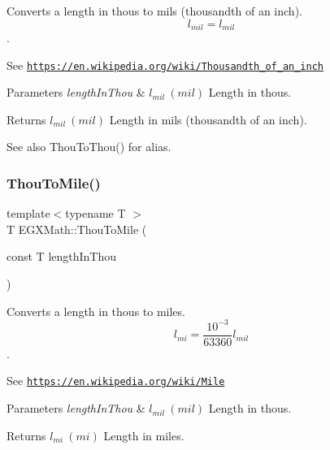 Converts a length in thous to mils (thousandth of an inch). \[ l_{mil}=l_{mil} \]. 

See \href{https://en.wikipedia.org/wiki/Thousandth_of_an_inch}{\tt https\+://en.\+wikipedia.\+org/wiki/\+Thousandth\+\_\+of\+\_\+an\+\_\+inch} 
\begin{DoxyParams}{Parameters}
{\em length\+In\+Thou} & $ l_{mil}\ (mil)$ Length in thous. \\
\hline
\end{DoxyParams}
\begin{DoxyReturn}{Returns}
$ l_{mil}\ (mil)$ Length in mils (thousandth of an inch). 
\end{DoxyReturn}
\begin{DoxySeeAlso}{See also}
Thou\+To\+Thou() for alias. 
\end{DoxySeeAlso}
\mbox{\label{group___e_g_x_math-_conversions-_length_conversions-_imperial-_thou-_imperial_ga1a3d3b11a614cf1e7086506cc0dc1430}} 
\subsubsection{\texorpdfstring{Thou\+To\+Mile()}{ThouToMile()}}
{\footnotesize\ttfamily template$<$typename T $>$ \\
T E\+G\+X\+Math\+::\+Thou\+To\+Mile (\begin{DoxyParamCaption}\item[{const T}]{length\+In\+Thou }\end{DoxyParamCaption})}



Converts a length in thous to miles. \[ l_{mi}=\frac{10^{-3}}{63360} l_{mil} \]. 

See \href{https://en.wikipedia.org/wiki/Mile}{\tt https\+://en.\+wikipedia.\+org/wiki/\+Mile} 
\begin{DoxyParams}{Parameters}
{\em length\+In\+Thou} & $ l_{mil}\ (mil)$ Length in thous. \\
\hline
\end{DoxyParams}
\begin{DoxyReturn}{Returns}
$ l_{mi}\ (mi)$ Length in miles. 
\end{DoxyReturn}
\mbox{\label{group___e_g_x_math-_conversions-_length_conversions-_imperial-_thou-_imperial_ga15eba45029ba30529fbd0038af9de3a2}} 
